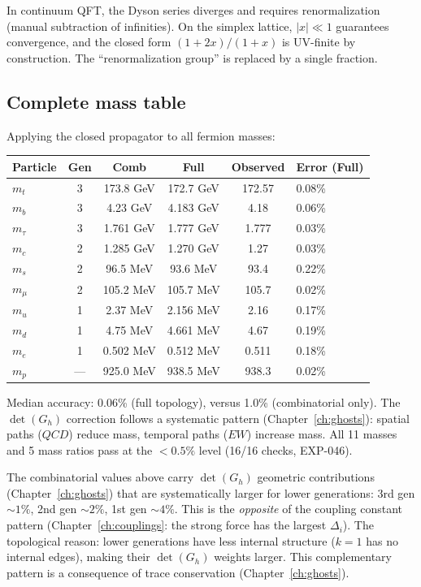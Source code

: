 \begin{remark}
In continuum QFT, the Dyson series diverges and requires renormalization (manual subtraction of infinities).  On the simplex lattice, $|x| \ll 1$ guarantees convergence, and the closed form $(1+2x)/(1+x)$ is UV-finite by construction.  The ``renormalization group'' is replaced by a single fraction.
\end{remark}

\subsection{Complete mass table}

Applying the closed propagator to all fermion masses:

\begin{center}
\begin{tabular}{lccccl}
\hline
Particle & Gen & Comb & Full & Observed & Error (Full) \\
\hline
$m_t$ & 3 & 173.8 GeV & 172.7 GeV & 172.57 & 0.08\% \\
$m_b$ & 3 & 4.23 GeV & 4.183 GeV & 4.18 & 0.06\% \\
$m_\tau$ & 3 & 1.761 GeV & 1.777 GeV & 1.777 & 0.03\% \\
\hline
$m_c$ & 2 & 1.285 GeV & 1.270 GeV & 1.27 & 0.03\% \\
$m_s$ & 2 & 96.5 MeV & 93.6 MeV & 93.4 & 0.22\% \\
$m_\mu$ & 2 & 105.2 MeV & 105.7 MeV & 105.7 & 0.02\% \\
\hline
$m_u$ & 1 & 2.37 MeV & 2.156 MeV & 2.16 & 0.17\% \\
$m_d$ & 1 & 4.75 MeV & 4.661 MeV & 4.67 & 0.19\% \\
$m_e$ & 1 & 0.502 MeV & 0.512 MeV & 0.511 & 0.18\% \\
\hline
$m_p$ & --- & 925.0 MeV & 938.5 MeV & 938.3 & 0.02\% \\
\hline
\end{tabular}
\end{center}

Median accuracy: 0.06\% (full topology), versus 1.0\% (combinatorial only).  The $\det(G_h)$ correction follows a systematic pattern (Chapter~\ref{ch:ghosts}): spatial paths ($QCD$) reduce mass, temporal paths ($EW$) increase mass.  All 11 masses and 5 mass ratios pass at the $< 0.5\%$ level (16/16 checks, EXP-046).

\begin{remark}
The combinatorial values above carry $\det(G_h)$ geometric contributions (Chapter~\ref{ch:ghosts}) that are systematically larger for lower generations: 3rd gen $\sim 1\%$, 2nd gen $\sim 2\%$, 1st gen $\sim 4\%$. This is the \emph{opposite} of the coupling constant pattern (Chapter~\ref{ch:couplings}: the strong force has the largest $\Delta_i$). The topological reason: lower generations have less internal structure ($k = 1$ has no internal edges), making their $\det(G_h)$ weights larger. This complementary pattern is a consequence of trace conservation (Chapter~\ref{ch:ghosts}).
\end{remark}

